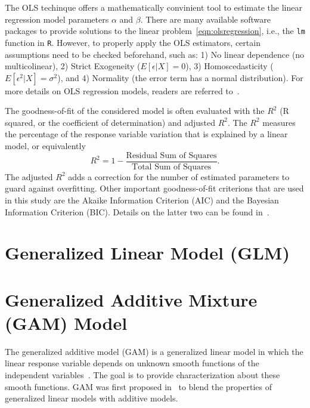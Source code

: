 \documentclass [11pt, proquest] {uwthesis}[2015/03/03]
\begin{document}
The OLS techinque offers a mathematically convinient tool to estimate the linear regression model parameters $\alpha$ and $\beta$. There are many available software packages to provide solutions to the linear problem~\eqref{eqn:olsregression}, i.e., the \texttt{lm} function in \texttt{R}. However, to properly apply the OLS estimators, certain assumptions need to be checked beforehand, such as: 1) No linear dependence (no multicolinear), 2) Strict Exogeneity ($E[\epsilon|X]=0$), 3) Homoscedasticity ($E[\epsilon^2|X]=\sigma^2$), and 4) Normality (the error term has a normal distribution). For more details on OLS regression models, readers are referred to~\cite{}.

The goodness-of-fit of the considered model is often evaluated with the $R^2$ (R squared, or the coefficient of determination) and adjusted $R^2$. The $R^2$ measures the percentage of the response variable variation that is explained by a linear model, or equivalently
\begin{equation}
R^2 = 1- \frac{\text{Residual Sum of Squares}}{\text{Total Sum of Squares}}.\label{eqn:R2}
\end{equation}
The adjusted $R^2$ adds a correction for the number of estimated parameters to guard against overfitting. Other important goodness-of-fit criterions that are used in this study are the Akaike Information Criterion (AIC) and the Bayesian Information Criterion (BIC). Details on the latter two can be found in~\cite{}.

\section{Generalized Linear Model (GLM)}

\section{Generalized Additive Mixture (GAM) Model}
\label{sec:gamintro}
The generalized additive model (GAM) is a generalized linear model in which the linear response variable depends on unknown smooth functions of the independent variables~\cite{Wiki}. The goal is to provide characterization about these smooth functions. GAM was first proposed in~\cite{Hastie86}	 to blend the properties of generalized linear models with additive models. 
\end{document}
